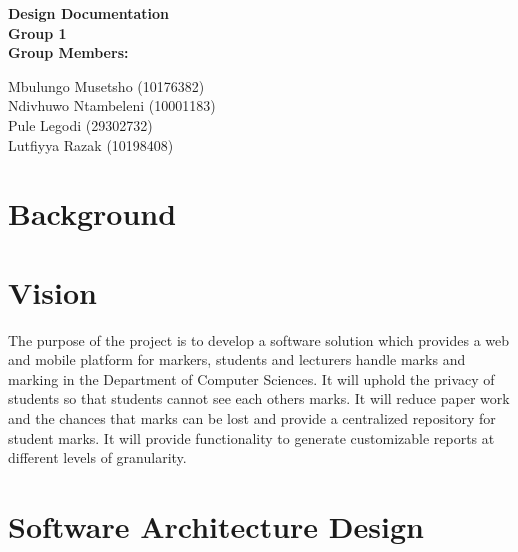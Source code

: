 \documentclass[12pt]{article}
\newcommand{\Title}{Design Documentation} %
\begin{document}
	\vspace{4em}
	
	\begin{center}%
	
	  \LARGE \bf \Title \\[4em]
	  \LARGE {\bf Group 1}\\[1em]
	  \LARGE {\bf Group Members:}\\[2em]
	  \large
	  
	     Mbulungo Musetsho				(10176382) \\[1em]
	     Ndivhuwo Ntambeleni			(10001183) \\[1em]
	     Pule Legodi                                (29302732) \\[1em]
	     Lutfiyya Razak				(10198408) \\[1em]
	    
	\end{center}%
	

	\newpage
	\tableofcontents
	
	\newpage
	\section{Background}
	
		\vspace{0.2in}
	
		
		 
	
	\section{Vision}
	The purpose of the project is to develop a software solution which provides
a web and mobile platform for markers, students and lecturers handle marks
and marking in the Department of Computer Sciences. It will uphold the
privacy of students so that students cannot see each others marks. It will
reduce paper work and the chances that marks can be lost and provide a
centralized repository for student marks. It will provide functionality to
generate customizable reports at different levels of granularity.
		\vspace{0.2in}
		
				
	
	\section{Software Architecture Design}
		\vspace{0.2in}
		
\end{document}
